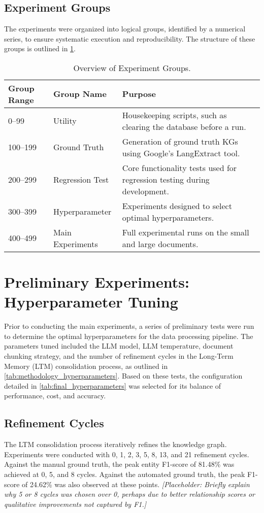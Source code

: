 \subsection{Experiment Groups}
\label{subsec:exp_groups}
The experiments were organized into logical groups, identified by a numerical series, to ensure systematic execution and reproducibility. The structure of these groups is outlined in \cref{tab:exp_groups}.

\begin{table}[!htbp]
\centering
\caption{Overview of Experiment Groups.}
\label{tab:exp_groups}
\begin{tabular}{@{}lll@{}}
\toprule
\textbf{Group Range} & \textbf{Group Name} & \textbf{Purpose} \\ \midrule
0--99      & Utility         & Housekeeping scripts, such as clearing the database before a run. \\
100--199   & Ground Truth    & Generation of ground truth KGs using Google's LangExtract tool. \\
200--299   & Regression Test & Core functionality tests used for regression testing during development. \\
300--399   & Hyperparameter  & Experiments designed to select optimal hyperparameters. \\
400--499   & Main Experiments& Full experimental runs on the small and large documents. \\ \bottomrule
\end{tabular}
\end{table}


\section{Preliminary Experiments: Hyperparameter Tuning}
\label{sec:hyperparameter_tuning}
Prior to conducting the main experiments, a series of preliminary tests were run to determine the optimal hyperparameters for the data processing pipeline. The parameters tuned included the LLM model, LLM temperature, document chunking strategy, and the number of refinement cycles in the Long-Term Memory (LTM) consolidation process, as outlined in \cref{tab:methodology_hyperparameters}. Based on these tests, the configuration detailed in \cref{tab:final_hyperparameters} was selected for its balance of performance, cost, and accuracy.

\subsection{Refinement Cycles}
The LTM consolidation process iteratively refines the knowledge graph. Experiments were conducted with 0, 1, 2, 3, 5, 8, 13, and 21 refinement cycles. Against the manual ground truth, the peak entity F1-score of 81.48\% was achieved at 0, 5, and 8 cycles. Against the automated ground truth, the peak F1-score of 24.62\% was also observed at these points. \textit{[Placeholder: Briefly explain why 5 or 8 cycles was chosen over 0, perhaps due to better relationship scores or qualitative improvements not captured by F1.]}

